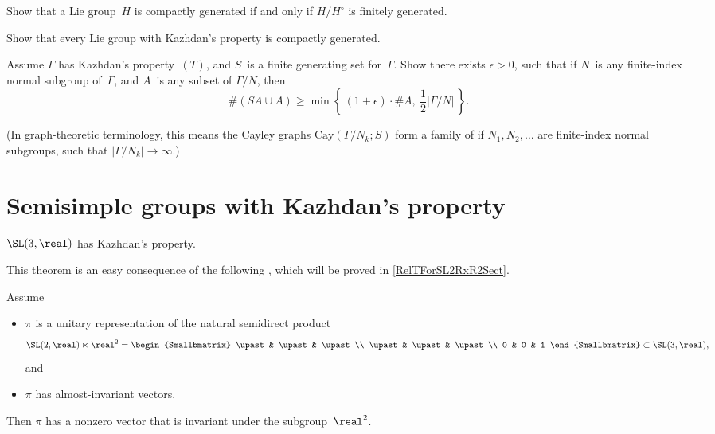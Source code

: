 \begin{exercises}
\item \label{CpctGen<>fg}
Show that a Lie group~$H$ is compactly generated if and only if $H/H^\circ$ is finitely generated.

\item \label{Kazhdan->CpctGen}
Show that every Lie group with Kazhdan's property is compactly generated.

\item \label{Kazhdan->Expander}
Assume $\Gamma$ has Kazhdan's property~$(T)$, and $S$~is a finite generating set for~$\Gamma$. Show there exists $\epsilon > 0$, such that if $N$~is any finite-index normal subgroup of~$\Gamma$, and $A$~is any subset of $\Gamma/N$, then
	$$ \#(SA \cup A) \ge \min \left\{\, (1+\epsilon) \cdot \#A, \ {\textstyle\frac{1}{2}} |\Gamma / N| \,\right\} .$$
{\smaller (In graph-theoretic terminology, this means the Cayley graphs $\mathrm{Cay}(\Gamma/N_k; S)$ form a family of  if $N_1,N_2,\ldots$ are finite-index normal subgroups, such that $|\Gamma/N_k| \to \infty$.)\par}

\end{exercises}

 
 
 
 
 \section{Semisimple groups with Kazhdan's property} \label{SSKazhdanSect}
 
 \begin{thm}[(Kazhdan)] \label{SL3RHasT}
 $\SL(3,\real)$ has Kazhdan's property.
 \end{thm}
 
 This theorem is an easy consequence of the following , which will be proved in \cref{RelTForSL2RxR2Sect}.
 
 \begin{lem} \label{RelTForSL2RxR2}
 Assume
 \noprelistbreak
 	\begin{itemize}
	\item $\pi$ is a unitary representation of the natural semidirect product 
		$$\SL(2,\real) \ltimes \real^2
		 =	\begin{Smallbmatrix}
			 \upast & \upast & \upast \\
			 \upast & \upast & \upast \\
			0 & 0 & 1 
			\end{Smallbmatrix}
			\subset \SL(3,\real) ,$$
	and 
	\item $\pi$ has almost-invariant vectors.
	\end{itemize}
Then $\pi$ has a nonzero vector that is invariant under the subgroup\/~$\real^2$.
\end{lem}

